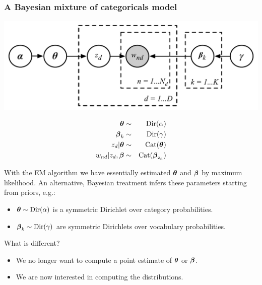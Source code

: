 \begin{frame}
\frametitle{A Bayesian mixture of categoricals model}

\begin{minipage}{0.7\linewidth}
\centerline{\includegraphics[width=0.9\linewidth]{bayes_mix_categorical_model}}
\end{minipage}
\begin{minipage}{0.29\linewidth}
{\small
\begin{eqnarray*}
\boldsymbol{\theta} & \sim & \mathrm{Dir}(\alpha) \\
\boldsymbol{\beta}_k & \sim & \mathrm{Dir}(\gamma) \\
z_d | \boldsymbol{\theta} & \sim & \rm{Cat}(\boldsymbol{\theta})\\
w_{nd} | z_d, \boldsymbol{\beta} & \sim & \rm{Cat}(\boldsymbol{\beta}_{z_d})
\end{eqnarray*}
}
\end{minipage}



With the EM algorithm we have essentially estimated $\boldsymbol{\theta}$ and $\boldsymbol{\beta}$ by maximum likelihood.
An alternative, Bayesian treatment infers these parameters starting from
priors, e.g.:
%
\begin{itemize}
\item $\boldsymbol{\theta}\sim\mathrm{Dir}(\alpha)$ is a symmetric Dirichlet over category probabilities.
\item $\boldsymbol{\beta}_k\sim\mathrm{Dir}(\gamma)$ are symmetric Dirichlets over vocabulary probabilities.
\end{itemize}
%

What is different?
\begin{itemize}
\item We no longer want to compute a point estimate of $\boldsymbol{\theta}$ or $\boldsymbol{\beta}$.
\item We are now interested in computing the  distributions.
\end{itemize}

\end{frame}

